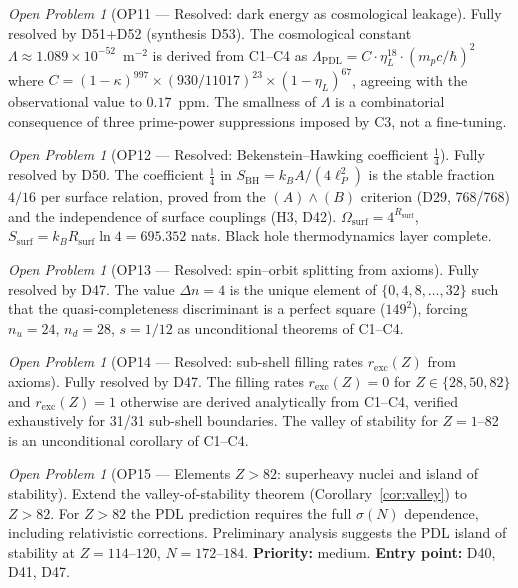 \documentclass[11pt,a4paper]{article}
\theoremstyle{plain}
\theoremstyle{definition}
\theoremstyle{remark}
\newtheorem{openproblem}[theorem]{Open Problem}
\newcommand{\Rsurf}{R_{\mathrm{surf}}}
\newcommand{\sigmaN}{\sigma(N)}
\newcommand{\SBH}{S_{\mathrm{BH}}}
\begin{document}
\begin{openproblem}[OP11 --- Resolved: dark energy as cosmological leakage]
\label{op:darkenergy}
\textcolor{proofblue}{Fully resolved by D51+D52 (synthesis D53).} The cosmological constant $\Lambda \approx 1.089 \times 10^{-52}$~m$^{-2}$ is derived from C1--C4 as $\Lambda_{\mathrm{PDL}} = C \cdot \eta_L^{18} \cdot (m_p c/\hbar)^2$ where $C = (1-\kappa)^{997} \times (930/11017)^{23} \times (1-\eta_L)^{67}$, agreeing with the observational value to $0.17$~ppm. The smallness of $\Lambda$ is a combinatorial consequence of three prime-power suppressions imposed by C3, not a fine-tuning.
\end{openproblem}

\begin{openproblem}[OP12 --- Resolved: Bekenstein--Hawking coefficient $\tfrac{1}{4}$]
\label{op:BHcoeff}
\textcolor{proofblue}{Fully resolved by D50.} The coefficient $\tfrac{1}{4}$ in $\SBH = k_B A/(4\ell_P^2)$ is the stable fraction $4/16$ per surface relation, proved from the $(A)\wedge(B)$ criterion (D29, 768/768) and the independence of surface couplings (H3, D42). $\Omega_{\mathrm{surf}} = 4^{\Rsurf}$, $S_{\mathrm{surf}} = k_B\Rsurf\ln 4 = 695.352$ nats. Black hole thermodynamics layer complete.
\end{openproblem}

\begin{openproblem}[OP13 --- Resolved: spin--orbit splitting from axioms]
\label{op:spinorbit}
\textcolor{proofblue}{Fully resolved by D47.} The value $\Delta n = 4$ is the unique element of $\{0,4,8,\ldots,32\}$ such that the quasi-completeness discriminant is a perfect square ($149^2$), forcing $n_u=24$, $n_d=28$, $s=1/12$ as unconditional theorems of C1--C4.
\end{openproblem}

\begin{openproblem}[OP14 --- Resolved: sub-shell filling rates $r_{\mathrm{exc}}(Z)$ from axioms]
\label{op:filling}
\textcolor{proofblue}{Fully resolved by D47.} The filling rates $r_{\mathrm{exc}}(Z) = 0$ for $Z \in \{28,50,82\}$ and $r_{\mathrm{exc}}(Z) = 1$ otherwise are derived analytically from C1--C4, verified exhaustively for 31/31 sub-shell boundaries. The valley of stability for $Z=1$--82 is an unconditional corollary of C1--C4.
\end{openproblem}

\begin{openproblem}[OP15 --- Elements $Z>82$: superheavy nuclei and island of stability]
\label{op:superheavy}
Extend the valley-of-stability theorem (Corollary~\ref{cor:valley}) to $Z>82$. For $Z>82$ the PDL prediction requires the full $\sigmaN$ dependence, including relativistic corrections. Preliminary analysis suggests the PDL island of stability at $Z=114$--$120$, $N=172$--$184$. \textbf{Priority:} medium. \textbf{Entry point:} D40, D41, D47.
\end{openproblem}
\end{document}

